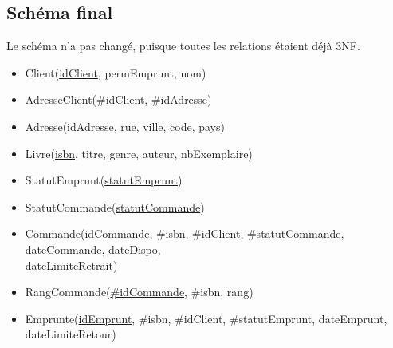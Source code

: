 \documentclass{article}
\begin{document}
\subsection{Schéma final}
Le schéma n'a pas changé, puisque toutes les relations étaient déjà 3NF.
\begin{itemize}[label=$\bullet$]
\item Client(\underline{idClient}, permEmprunt, nom)
\item AdresseClient(\underline{\#idClient}, \underline{\#idAdresse})
\item Adresse(\underline{idAdresse}, rue, ville, code, pays)
\item Livre(\underline{isbn}, titre, genre, auteur, nbExemplaire)
\item StatutEmprunt(\underline{statutEmprunt})
\item StatutCommande(\underline{statutCommande})
\item Commande(\underline{idCommande}, \#isbn, \#idClient, \#statutCommande,
  dateCommande, dateDispo, \\
  dateLimiteRetrait)
\item RangCommande(\underline{\#idCommande}, \#isbn, rang)
\item Emprunte(\underline{idEmprunt}, \#isbn, \#idClient, \#statutEmprunt,
  dateEmprunt, dateLimiteRetour)
\end{itemize}
\end{document}
